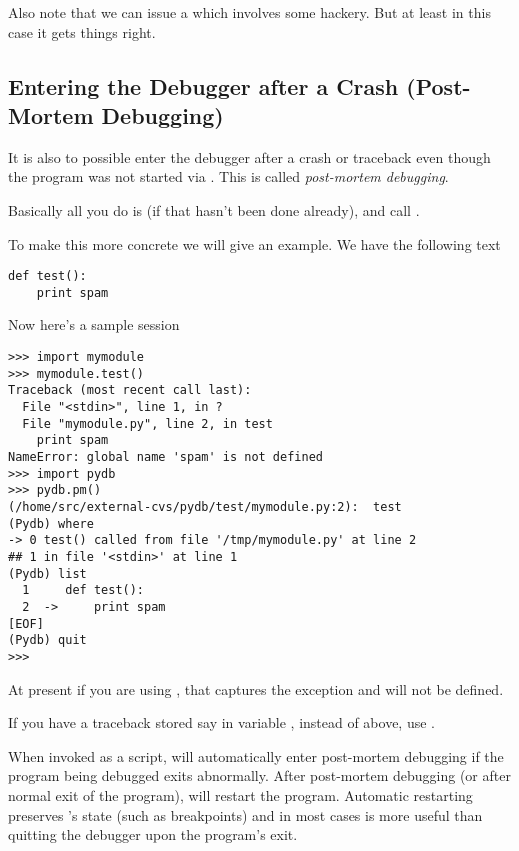 Also note that we can issue a  which involves some
hackery. But at least in this case it gets things right.

\subsection{Entering the Debugger after a Crash (Post-Mortem Debugging)}\label{subsection-post-mortem}

It is also to possible enter the debugger after a crash or traceback
even though the program was not started via . This is
called \emph{post-mortem debugging}.

Basically all you do is  (if that hasn't been done
already), and call .

To make this more concrete we will give an example. We have the
following text 

\begin{verbatim}
def test():
    print spam
\end{verbatim}

Now here's a sample session

\begin{verbatim}
>>> import mymodule
>>> mymodule.test()
Traceback (most recent call last):
  File "<stdin>", line 1, in ?
  File "mymodule.py", line 2, in test
    print spam
NameError: global name 'spam' is not defined
>>> import pydb
>>> pydb.pm()
(/home/src/external-cvs/pydb/test/mymodule.py:2):  test
(Pydb) where
-> 0 test() called from file '/tmp/mymodule.py' at line 2
## 1 in file '<stdin>' at line 1
(Pydb) list
  1     def test():
  2  ->     print spam
[EOF]
(Pydb) quit
>>> 
\end{verbatim}

At present if you are using , that captures the
exception and  will not be defined.

If you have a traceback stored say in variable , instead of 
 above, use .

When invoked as a script,  will automatically enter
post-mortem debugging if the program being debugged exits
abnormally. After post-mortem debugging (or after normal exit of the
program),  will restart the program.  Automatic restarting
preserves 's state (such as breakpoints) and in most cases is more
useful than quitting the debugger upon the program's exit.

